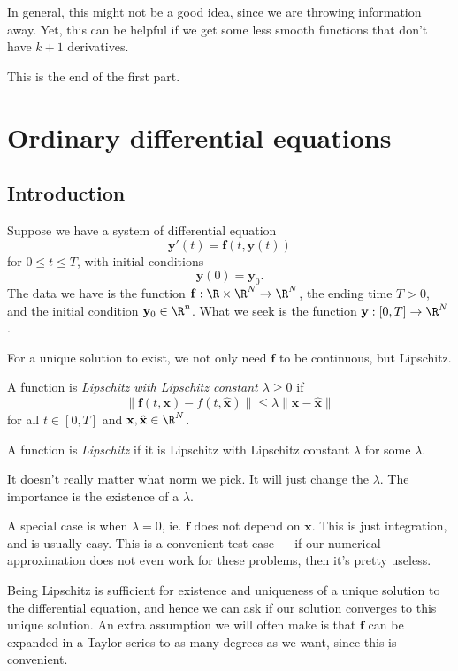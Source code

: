 \documentclass[a4paper]{article}
\begin{document}
In general, this might not be a good idea, since we are throwing information away. Yet, this can be helpful if we get some less smooth functions that don't have $k + 1$ derivatives.

This is the end of the first part.

\section{Ordinary differential equations}
\subsection{Introduction}
Suppose we have a system of differential equation
\[
  \mathbf{y}'(t) = \mathbf{f}(t, \mathbf{y}(t))
\]
for $0 \leq t \leq T$, with initial conditions
\[
  \mathbf{y}(0) = \mathbf{y}_0.
\]
The data we have is the function $\mathbf{f}: \R \times \R^N \to \R^N$, the ending time $T > 0$, and the initial condition $\mathbf{y}_0 \in \R^n$. What we seek is the function $\mathbf{y}: [0, T] \to \R^N$.

For a unique solution to exist, we not only need $\mathbf{f}$ to be continuous, but Lipschitz.
\begin{defi}
  A function is \emph{Lipschitz with Lipschitz constant $\lambda \geq 0$} if
  \[
    \|\mathbf{f}(t, \mathbf{x}) - f(t, \hat{\mathbf{x}})\| \leq \lambda \|\mathbf{x} - \hat{\mathbf{x}}\|
  \]
  for all $t \in [0, T]$ and $\mathbf{x}, \hat{\mathbf{x}} \in \R^N$.

  A function is \emph{Lipschitz} if it is Lipschitz with Lipschitz constant $\lambda$ for some $\lambda$.
\end{defi}
It doesn't really matter what norm we pick. It will just change the $\lambda$. The importance is the existence of a $\lambda$.

A special case is when $\lambda = 0$, ie. $\mathbf{f}$ does not depend on $\mathbf{x}$. This is just integration, and is usually easy. This is a convenient test case --- if our numerical approximation does not even work for these problems, then it's pretty useless.

Being Lipschitz is sufficient for existence and uniqueness of a unique solution to the differential equation, and hence we can ask if our solution converges to this unique solution. An extra assumption we will often make is that $\mathbf{f}$ can be expanded in a Taylor series to as many degrees as we want, since this is convenient.
\end{document}
